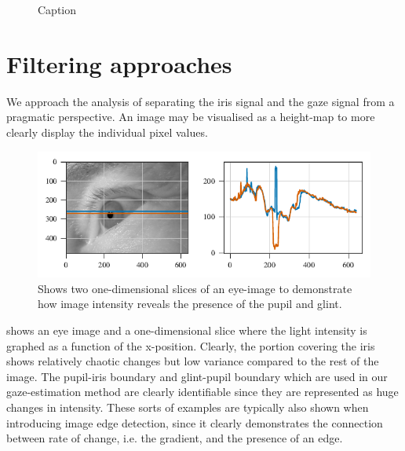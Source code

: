 \begin{figure}
    \centering
    \caption{Caption}
    \label{fig:my_label}
\end{figure}



\section{Filtering approaches}
We approach the analysis of separating the iris signal and the gaze signal from a pragmatic perspective. An image may be visualised as a height-map to more clearly display the individual pixel values. 

\begin{figure}
	\includegraphics[width=1\textwidth]{figures/1dimage}
	\caption{Shows two one-dimensional slices of an eye-image to demonstrate how image intensity reveals the presence of the pupil and glint.}\label{fig:1dimage}
\end{figure}

 shows an eye image and a one-dimensional slice where the light intensity is graphed as a function of the x-position. Clearly, the portion covering the iris shows relatively chaotic changes but low variance compared to the rest of the image. The pupil-iris boundary and glint-pupil boundary which are used in our gaze-estimation method are clearly identifiable since they are represented as huge changes in intensity. These sorts of examples are typically also shown when introducing image edge detection, since it clearly demonstrates the connection between rate of change, i.e. the gradient, and the presence of an edge. 

